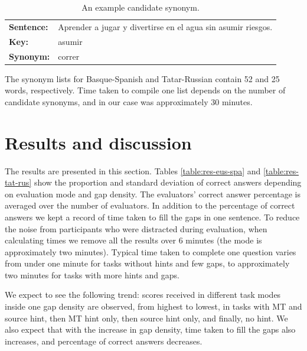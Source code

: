 \documentclass[11pt]{article}
\newcommand{\comment}[1]{\marginpar{\scriptsize\sf \textcolor{blue}{#1}}}
\begin{document}
\begin{table}
  \centering
  \begin{tabular}{|l|l|}
     \hline
     \textbf{Sentence:}   & Aprender a jugar y divertirse en el agua sin asumir riesgos. \\
     \textbf{Key:}   & asumir \\
     \textbf{Synonym:} & correr \\
     \hline
  \end{tabular}
  \caption{An example candidate synonym.} 
  \label{table:syn}
\end{table}
\comment{EA: added}
The synonym lists for Basque-Spanish and Tatar-Russian contain 52 and 25 words, respectively. Time taken to compile one list depends on the number of candidate synonyms, and in our case was approximately 30 minutes. 
\comment{FMT: How long did making the synonym list take, how many synonyms were added? More details here. Also perhaps an example?}

\section{Results and discussion}
\label{sec:results}

The results are presented in this section. Tables \ref{table:res-eus-spa} and \ref{table:res-tat-rus} show
the proportion and standard deviation of correct answers depending on evaluation mode and gap density.\comment{FMT: We should probably integrate the other tables, and refer to them using labels.} The evaluators' correct answer percentage is averaged over the number of evaluators. In addition to the percentage of correct answers we kept a record of time taken to fill the gaps in one sentence. To reduce the noise from participants who were distracted during evaluation, when
calculating times we remove all the results over 6 minutes (the mode is approximately
two minutes). Typical time taken to complete one question varies from under one minute for tasks without hints and few gaps, to approximately two minutes for tasks with more hints and gaps.

We expect to see the following trend: scores received in different task modes inside one gap density are observed, from highest to lowest, in tasks with MT and source hint, then MT hint only, then source hint only, and finally, no hint. We also expect that with the increase in gap density, time taken to fill the gaps also increases, and percentage of correct answers decreases. 
\end{document}
